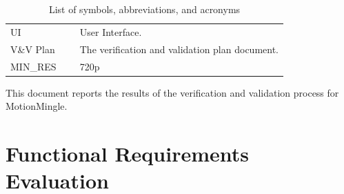 \documentclass[12pt, titlepage]{article}
\begin{document}
\begin{table}[H]
\begin{tabular}{L{0.25\linewidth}L{0.8\linewidth}}
    UI                         & User Interface.                                                                                                                                                                    \\
    V\&V Plan                  & The verification and validation plan document.                                                                                                                                     \\
    MIN\_RES \label{const:res} & 720p                                                                                                                                                                               \\ \bottomrule
  \end{tabular}
  \caption{List of symbols, abbreviations, and acronyms}
  \label{tab:abbrv}
\end{table}

\newpage

\tableofcontents

\listoftables %

\listoffigures %

\newpage


This document reports the results of the verification and validation process for
MotionMingle.

\section{Functional Requirements Evaluation}
\end{document}
